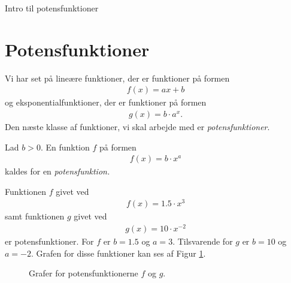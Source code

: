 \begin{center}
\Huge
Intro til potensfunktioner
\end{center}

\section*{Potensfunktioner}



Vi har set på lineære funktioner, der er funktioner på formen
\begin{align*}
	f(x) = ax + b
\end{align*}
og eksponentialfunktioner, der er funktioner på formen
\begin{align*}
	g(x) = b\cdot a^x.
\end{align*}
Den næste klasse af funktioner, vi skal arbejde med er \textit{potensfunktioner}.
\begin{defn}[Potensfunktion]
	Lad $b > 0$. En funktion $f$ på formen
	\begin{align*}
		f(x) = b\cdot x^a
	\end{align*}
	kaldes for en \textit{potensfunktion.}
\end{defn}


\begin{exa}
	Funktionen $f$ givet ved
	\begin{align*}
		f(x) = 1.5 \cdot x^3
	\end{align*}
	samt funktionen $g$ givet ved
	\begin{align*}
		g(x) = 10\cdot x^{-2}
	\end{align*}
	er potensfunktioner. For $f$ er $b = 1.5$ og $a = 3$. Tilsvarende for $g$ er $b = 10$ og $a = -2$.
	Grafen for disse funktioner kan ses af Figur \ref{fig:potensgraf}.
	
	\begin{figure}[H]
		\centering
		\caption{Grafer for potensfunktionerne $f$ og $g$.}
		\label{fig:potensgraf}
	\end{figure}
\end{exa}

